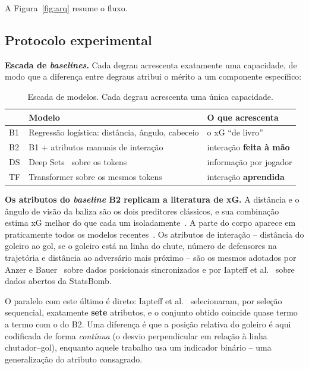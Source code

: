 \documentclass[12pt]{article}
\begin{document}
A Figura~\ref{fig:arq} resume o fluxo.

\subsection{Protocolo experimental}

\textbf{Escada de \emph{baselines}.} Cada degrau acrescenta exatamente uma
capacidade, de modo que a diferença entre degraus atribui o mérito a um
componente específico:

\begin{table}[ht]
\centering
\caption{Escada de modelos. Cada degrau acrescenta uma única capacidade.}
\label{tab:escada}
\begin{tabular}{@{}lll@{}}
\toprule
 & Modelo & O que acrescenta \\
\midrule
B1 & Regressão logística: distância, ângulo, cabeceio & o xG ``de livro'' \\
B2 & B1 + atributos manuais de interação & interação \textbf{feita à mão} \\
DS & Deep Sets~\cite{zaheer2017} sobre os tokens & informação por jogador \\
TF & Transformer sobre os mesmos tokens & interação \textbf{aprendida} \\
\bottomrule
\end{tabular}
\end{table}

\textbf{Os atributos do \emph{baseline} B2 replicam a literatura de xG.} A
distância e o ângulo de visão da baliza são os dois preditores clássicos, e sua
combinação estima xG melhor do que cada um isoladamente~\cite{rathke2017examination}.
A parte do corpo aparece em praticamente todos os modelos
recentes~\cite{anzer2021goal,mead2023expected}. Os atributos de interação --
distância do goleiro ao gol, se o goleiro está na linha do chute, número de
defensores na trajetória e distância ao adversário mais próximo -- são os mesmos
adotados por Anzer e Bauer~\cite{anzer2021goal} sobre dados posicionais sincronizados e
por Iapteff et al.~\cite{iapteff2025interpretable} sobre dados abertos da StatsBomb.

O paralelo com este último é direto: Iapteff et al.~\cite{iapteff2025interpretable}
selecionaram, por seleção sequencial, exatamente \textbf{sete} atributos, e o
conjunto obtido coincide quase termo a termo com o do B2. Uma diferença é que a
posição relativa do goleiro é aqui codificada de forma \emph{contínua} (o desvio
perpendicular em relação à linha chutador--gol), enquanto aquele trabalho usa um
indicador binário -- uma generalização do atributo consagrado.
\end{document}
